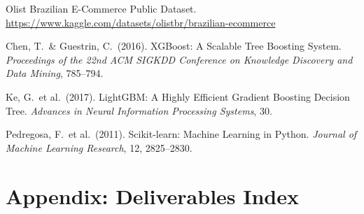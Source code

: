 \documentclass[11pt,a4paper]{article}
\begin{document}
\begin{enumerate}[label={[\arabic*]}]
  \item Olist Brazilian E-Commerce Public Dataset.
        \url{https://www.kaggle.com/datasets/olistbr/brazilian-ecommerce}
  \item Chen, T.\ \& Guestrin, C.\ (2016).
        XGBoost: A Scalable Tree Boosting System.
        \emph{Proceedings of the 22nd ACM SIGKDD Conference on Knowledge
        Discovery and Data Mining}, 785--794.
  \item Ke, G.\ et al.\ (2017).
        LightGBM: A Highly Efficient Gradient Boosting Decision Tree.
        \emph{Advances in Neural Information Processing Systems}, 30.
  \item Pedregosa, F.\ et al.\ (2011).
        Scikit-learn: Machine Learning in Python.
        \emph{Journal of Machine Learning Research}, 12, 2825--2830.
\end{enumerate}

\newpage
\section*{Appendix: Deliverables Index}
\end{document}
